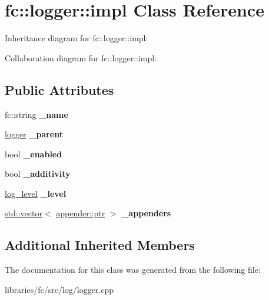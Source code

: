 \hypertarget{classfc_1_1logger_1_1impl}{}\section{fc\+:\+:logger\+:\+:impl Class Reference}
\label{classfc_1_1logger_1_1impl}


Inheritance diagram for fc\+:\+:logger\+:\+:impl\+:


Collaboration diagram for fc\+:\+:logger\+:\+:impl\+:
\subsection*{Public Attributes}
\begin{DoxyCompactItemize}
\item 
\mbox{\label{classfc_1_1logger_1_1impl_a00cfe5496da113df0f89fb74e02b5740}} 
fc\+::string {\bfseries \+\_\+name}
\item 
\mbox{\label{classfc_1_1logger_1_1impl_ac5fbad0835e7f2c0f101b7526f760798}} 
\mbox{\hyperlink{classfc_1_1logger}{logger}} {\bfseries \+\_\+parent}
\item 
\mbox{\label{classfc_1_1logger_1_1impl_a35693d211bf5e51aa62891a6f80c8159}} 
bool {\bfseries \+\_\+enabled}
\item 
\mbox{\label{classfc_1_1logger_1_1impl_a27de60fedcef6eafffaffb2eb0b1cd50}} 
bool {\bfseries \+\_\+additivity}
\item 
\mbox{\label{classfc_1_1logger_1_1impl_a7723d5aa07e346a7dc5c72671d2ce71a}} 
\mbox{\hyperlink{classfc_1_1log__level}{log\+\_\+level}} {\bfseries \+\_\+level}
\item 
\mbox{\label{classfc_1_1logger_1_1impl_af9819cacb4eb156252152968d9c68a99}} 
\mbox{\hyperlink{classstd_1_1vector}{std\+::vector}}$<$ \mbox{\hyperlink{classfc_1_1shared__ptr}{appender\+::ptr}} $>$ {\bfseries \+\_\+appenders}
\end{DoxyCompactItemize}
\subsection*{Additional Inherited Members}


The documentation for this class was generated from the following file\+:\begin{DoxyCompactItemize}
\item 
libraries/fc/src/log/logger.\+cpp\end{DoxyCompactItemize}
